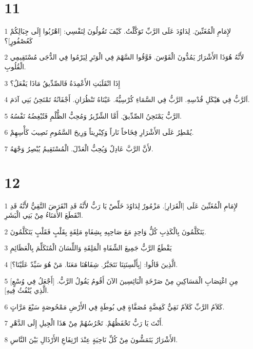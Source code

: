 \chapter{11}

\par 1 لإِمَامِ الْمُغَنِّينَ. لِدَاوُدَ عَلَى الرَّبِّ تَوَكَّلْتُ. كَيْفَ تَقُولُونَ لِنَفْسِي: [اهْرُبُوا إِلَى جِبَالِكُمْ كَعُصْفُورٍ]؟
\par 2 لأَنَّهُ هُوَذَا الأَشْرَارُ يَمُدُّونَ الْقَوْسَ. فَوَّقُوا السَّهْمَ فِي الْوَتَرِ لِيَرْمُوا فِي الدُّجَى مُسْتَقِيمِي الْقُلُوبِ.
\par 3 إِذَا انْقَلَبَتِ الأَعْمِدَةُ فَالصِّدِّيقُ مَاذَا يَفْعَلُ؟
\par 4 اَلرَّبُّ فِي هَيْكَلِ قُدْسِهِ. الرَّبُّ فِي السَّمَاءِ كُرْسِيُّهُ. عَيْنَاهُ تَنْظُرَانِ. أَجْفَانُهُ تَمْتَحِنُ بَنِي آدَمَ.
\par 5 الرَّبُّ يَمْتَحِنُ الصِّدِّيقَ. أَمَّا الشِّرِّيرُ وَمُحِبُّ الظُّلْمِ فَتُبْغِضُهُ نَفْسُهُ.
\par 6 يُمْطِرُ عَلَى الأَشْرَارِ فِخَاخاً نَاراً وَكِبْرِيتاً وَرِيحَ السَّمُومِ نَصِيبَ كَأْسِهِمْ.
\par 7 لأَنَّ الرَّبَّ عَادِلٌ وَيُحِبُّ الْعَدْلَ. الْمُسْتَقِيمُ يُبْصِرُ وَجْهَهُ.

\chapter{12}

\par 1 لإِمَامِ الْمُغَنِّينَ عَلَى [الْقَرَارِ]. مَزْمُورٌ لِدَاوُدَ خَلِّصْ يَا رَبُّ لأَنَّهُ قَدِ انْقَرَضَ التَّقِيُّ لأَنَّهُ قَدِ انْقَطَعَ الأُمَنَاءُ مِنْ بَنِي الْبَشَرِ.
\par 2 يَتَكَلَّمُونَ بِالْكَذِبِ كُلُّ وَاحِدٍ مَعَ صَاحِبِهِ بِشِفَاهٍ مَلِقَةٍ بِقَلْبٍ فَقَلْبٍ يَتَكَلَّمُونَ.
\par 3 يَقْطَعُ الرَّبُّ جَمِيعَ الشِّفَاهِ الْمَلِقَةِ وَاللِّسَانَ الْمُتَكَلِّمَ بِالْعَظَائِمِ
\par 4 الَّذِينَ قَالُوا: [بِأَلْسِنَتِنَا نَتَجَبَّرُ. شِفَاهُنَا مَعَنَا. مَنْ هُوَ سَيِّدٌ عَلَيْنَا؟].
\par 5 [مِنِ اغْتِصَابِ الْمَسَاكِينِ مِنْ صَرْخَةِ الْبَائِسِينَ الآنَ أَقُومُ يَقُولُ الرَّبُّ. [أَجْعَلُ فِي وُسْعٍ الَّذِي يُنْفُثُ فِيهِ].
\par 6 كَلاَمُ الرَّبِّ كَلاَمٌ نَقِيٌّ كَفِضَّةٍ مُصَفَّاةٍ فِي بُوطَةٍ فِي الأَرْضِ مَمْحُوصَةٍ سَبْعَ مَرَّاتٍ.
\par 7 أَنْتَ يَا رَبُّ تَحْفَظُهُمْ. تَحْرُسُهُمْ مِنْ هَذَا الْجِيلِ إِلَى الدَّهْرِ.
\par 8 الأَشْرَارُ يَتَمَشُّونَ مِنْ كُلِّ نَاحِيَةٍ عِنْدَ ارْتِفَاعِ الأَرْذَالِ بَيْنَ النَّاسِ.

